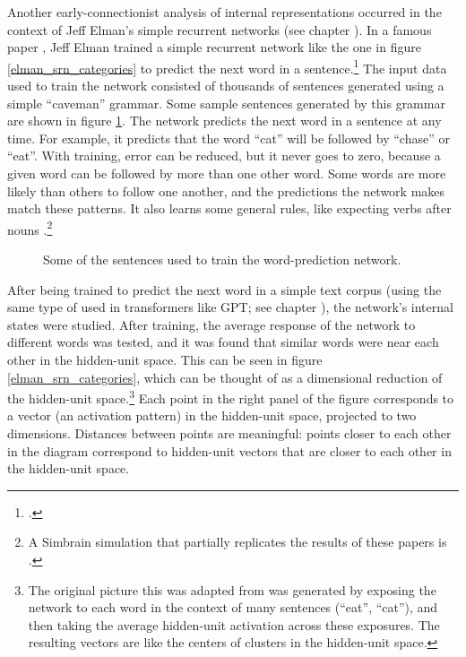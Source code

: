 Another early-connectionist analysis of internal representations occurred in the context of Jeff Elman's simple recurrent networks (see chapter ). In a famous paper \cite{elman1990finding}, Jeff Elman trained a simple recurrent network like the one in figure \ref{elman_srn_categories} to predict the next word in a sentence.\footnote{.}  The input data used to train the network consisted of thousands of sentences generated using a simple ``caveman'' grammar. Some sample sentences generated by this grammar are shown in figure \ref{elman_sentences}. The network predicts the next word in a sentence at any time. For example, it predicts that the word ``cat'' will be followed by ``chase'' or ``eat''. With training, error can be reduced, but it never goes to zero, because a given word can be followed by more than one other word. Some words are more likely than others to follow one another, and the predictions the network makes match these patterns. It also learns some general rules, like expecting verbs after nouns \cite{elman1990finding}.\footnote{A Simbrain simulation that partially replicates the results of these papers is .}

\begin{figure}[htbp]
\centering
{}
\caption[Generated by Jeff Yoshimi based on \cite{elman1990finding}.]{Some of the sentences used to train the word-prediction network.}
\label{elman_sentences}
\end{figure}

After being trained to predict the next word in a simple text corpus (using the same type of  used in transformers like GPT; see chapter ), the network's internal states were studied. After training, the average response of the network to different words was tested, and it was found that similar words were near each other in the hidden-unit space. This can be seen in figure \ref{elman_srn_categories}, which can be thought of as a dimensional reduction of the hidden-unit space.\footnote{The original picture this was adapted from was generated by exposing the network to each word in the context of many sentences (\eg ``eat'', ``cat''), and then taking the average hidden-unit activation across these exposures. The resulting vectors are like the centers of clusters in the hidden-unit space.}  Each point in the right panel of the figure corresponds to a vector (an activation pattern) in the hidden-unit space, projected to two dimensions. Distances between points are meaningful: points closer to each other in the diagram correspond to hidden-unit vectors that are closer to each other in the hidden-unit space.


